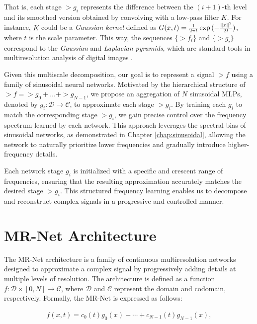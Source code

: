 That is, each stage $\gt{g}_i$ represents the difference between the $(i+1)$-th level and its smoothed version obtained by convolving with a low-pass filter $K$. For instance, $K$ could be a \textit{Gaussian kernel} defined as $G(x,t)=\frac{1}{2\pi t}\exp{(-\frac{\lVert x\rVert^2}{2t})}$, where $t$ is the scale parameter. This way, the sequences $\{\gt{f}_i\}$ and $\{\gt{g}_i\}$ correspond to the \textit{Gaussian} and \textit{Laplacian pyramids}, which are standard tools in multiresolution analysis of digital images \cite{rosenfeld2013multiresolution,lindeberg1994scale,velho2009image}.

Given this multiscale decomposition, our goal is to represent a signal $\gt{f}$ using a family of sinusoidal neural networks. Motivated by the hierarchical structure of $\gt{f}=\gt{g}_0+\dots+\gt{g}_{N-1}$, we propose an aggregation of $N$ sinusoidal MLPs, denoted by $g_i:\mathcal{D}\to \mathcal{C}$, to approximate each stage $\gt{g}_i$. By training each $g_i$ to match the corresponding stage $\gt{g}_i$, we gain precise control over the frequency spectrum learned by each network. This approach leverages the spectral bias of sinusoidal networks, as demonstrated in Chapter \ref{chap:sinusoidal}, allowing the network to naturally prioritize lower frequencies and gradually introduce higher-frequency details.

Each network stage $g_i$ is initialized with a specific and crescent range of frequencies, ensuring that the resulting approximation accurately matches the desired stage $\gt{g}_i$. This structured frequency learning enables us to decompose and reconstruct complex signals in a progressive and controlled manner.

\section{MR-Net Architecture}

The MR-Net architecture is a family of continuous multiresolution networks designed to approximate a complex signal by progressively adding details at multiple levels of resolution. The architecture is defined as a function \( f:\mathcal{D} \times [0,N] \to \mathcal{C} \), where \(\mathcal{D}\) and \(\mathcal{C}\) represent the domain and codomain, respectively. Formally, the MR-Net is expressed as follows:

\begin{align}\label{e-mrnet}
f(x,t) = c_0(t) g_0(x) + \cdots + c_{N-1}(t) g_{N-1}(x),
\end{align}

